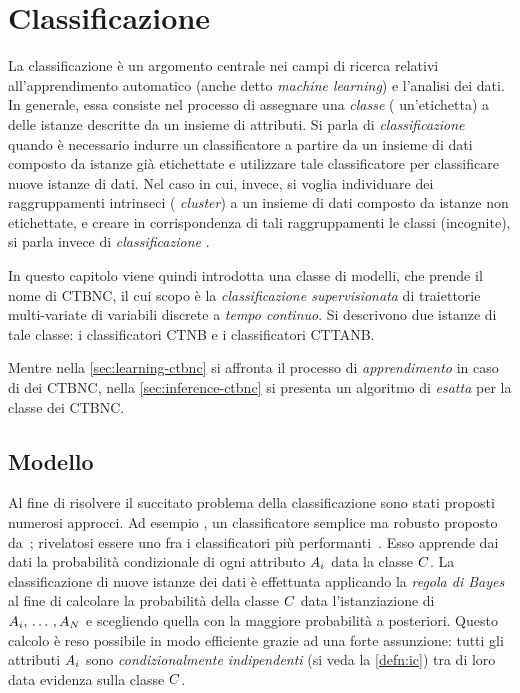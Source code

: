 
\chapter{Classificazione}
\label{cap:ctbnc}
La classificazione è un argomento centrale nei campi di ricerca relativi all'apprendimento automatico (anche detto \emph{machine learning}) e l'analisi dei dati. In generale, essa consiste nel processo di assegnare una \emph{classe} (\ie{} un'etichetta) a delle istanze descritte da un insieme di attributi. Si parla di \emph{classificazione } quando è necessario indurre un classificatore a partire da un insieme di dati composto da istanze già etichettate e utilizzare tale classificatore per classificare nuove istanze di dati. Nel caso in cui, invece, si voglia individuare dei raggruppamenti intrinseci (\ie{} \emph{cluster}) a un insieme di dati composto da istanze non etichettate, e creare in corrispondenza di tali raggruppamenti le classi (incognite), si parla invece di \emph{classificazione }.

In questo capitolo viene quindi introdotta una classe di modelli, che prende il nome di \acf{CTBNC}, il cui scopo è la \emph{classificazione supervisionata} di traiettorie multi-variate di variabili discrete a \emph{tempo continuo}. Si descrivono due istanze di tale classe: i classificatori \acf{CTNB} e i classificatori \acf{CTTANB}.

Mentre nella \autoref{sec:learning-ctbnc} si affronta il processo di \emph{apprendimento} in caso di \emph{} dei \acs{CTBNC}, nella \autoref{sec:inference-ctbnc} si presenta un algoritmo di \emph{ esatta} per la classe dei \acs{CTBNC}.

\section{Modello}\label{sec:ctbnc-model}
Al fine di risolvere il succitato problema della classificazione sono stati proposti numerosi approcci. Ad esempio \nb{} \upcase \class{}, un classificatore semplice ma robusto proposto da~\citet{DudaHart1973}; rivelatosi essere uno fra i classificatori più performanti~\citep{Langley1992}. Esso apprende dai dati la probabilità condizionale di ogni attributo $\mathnormal{A}_i$ data la classe $\mathnormal{C}$. La classificazione di nuove istanze dei dati è effettuata applicando la \emph{regola di Bayes} al fine di calcolare la probabilità della classe $\mathnormal{C}$ data l'istanziazione di $\mathnormal{A}_i,\,\dotsc\,,\mathnormal{A}_N$ e scegliendo quella con la maggiore probabilità a posteriori. Questo calcolo è reso possibile in modo efficiente grazie ad una forte assunzione: tutti gli attributi $\mathnormal{A}_i$ sono \emph{condizionalmente indipendenti} (si veda la \autoref{defn:ic}) tra di loro data evidenza sulla classe $\mathnormal{C}$.

